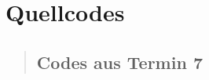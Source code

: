 \section{Quellcodes}
\begin{quote}

	\subsection{Codes aus Termin 7}
	\begin{quote}
% 	        
% 	    
% 	        
% 
%             
% 	    
% 	        
	    
	\end{quote}
\end{quote}



